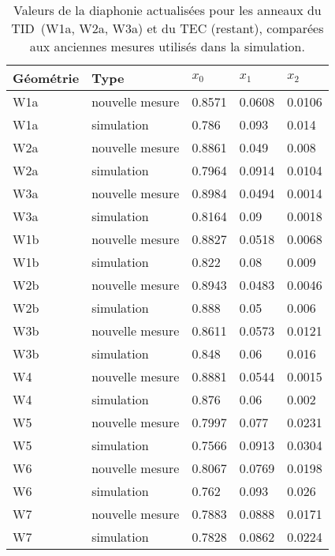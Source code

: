 \begin{table}[h]
\begin{center}
\begin{tabular}{|l|l|l|l|l|}
\hline
Géométrie  & Type & $x_{0}$ & $x_{1}$ & $x_{2}$ \\
\hline
\hline
W1a &  nouvelle mesure & 0.8571 & 0.0608 & 0.0106 \\
W1a &  simulation & 0.786 & 0.093 & 0.014 \\
\hline
W2a &  nouvelle mesure & 0.8861 & 0.049 & 0.008 \\
W2a &  simulation & 0.7964 & 0.0914 & 0.0104 \\
\hline
W3a &  nouvelle mesure & 0.8984 & 0.0494 & 0.0014 \\
W3a &  simulation & 0.8164 & 0.09 & 0.0018 \\
\hline
W1b &  nouvelle mesure & 0.8827 & 0.0518 & 0.0068 \\
W1b &  simulation & 0.822 & 0.08 & 0.009 \\
\hline
W2b &  nouvelle mesure & 0.8943 & 0.0483 & 0.0046 \\
W2b &  simulation & 0.888 & 0.05 & 0.006 \\
\hline
W3b &  nouvelle mesure & 0.8611 & 0.0573 & 0.0121 \\
W3b &  simulation & 0.848 & 0.06 & 0.016 \\
\hline
W4 &  nouvelle mesure & 0.8881 & 0.0544 & 0.0015 \\
W4 &  simulation & 0.876 & 0.06 & 0.002 \\
\hline
W5 &  nouvelle mesure & 0.7997 & 0.077 & 0.0231 \\
W5 &  simulation & 0.7566 & 0.0913 & 0.0304 \\
\hline
W6 &  nouvelle mesure & 0.8067 & 0.0769 & 0.0198 \\
W6 &  simulation & 0.762 & 0.093 & 0.026 \\
\hline
W7 &  nouvelle mesure & 0.7883 & 0.0888 & 0.0171 \\
W7 &  simulation & 0.7828 & 0.0862 & 0.0224 \\
\hline
\end{tabular}
\caption[Table caption text]{ Valeurs de la diaphonie actualisées pour les anneaux du TID~(W1a, W2a, W3a) et du TEC (restant), comparées aux anciennes mesures utilisés dans la simulation. }
\label{tab:measuredXtalkTODTEC2}
\end{center}
\end{table}


